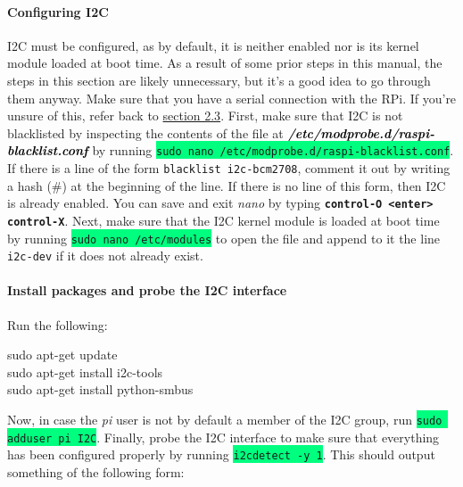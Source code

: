 \documentclass{article}
\newcommand*{\myfont}{\fontfamily{pcr}\selectfont}
\newcommand{\codei}[1]{\colorbox{SpringGreen}{\texttt{#1}}} %
\newcommand{\codeb}[2]{
  \begin{tcolorbox}[width=\textwidth,colback={SpringGreen},title={#1},colbacktitle=darkgreen,coltitle=SpringGreen]
    \myfont
    #2
  \end{tcolorbox}
} %
\newcommand{\outputi}[1]{\colorbox{light-gray}{\texttt{#1}}} %
\newcommand{\red}[1]{\textcolor{BrickRed}{#1}} %
\newcommand{\loc}[1]{\textit{\textcolor{Black}{\textbf{#1}}}} %
\begin{document}
    \paragraph{Configuring I2C}
      \label{sec:configuring-i2c}
      I2C must be configured, as by default, it is neither enabled nor is its kernel module loaded at boot time. As a result of some prior steps in this manual, the steps in this section are likely unnecessary, but it's a good idea to go through them anyway. Make sure that you have a serial connection with the RPi. If you're unsure of this, refer back to \hyperref[sec:connect-serial]{section 2.3}.
      \newline
      \indent
      First, make sure that I2C is not blacklisted by inspecting the contents of the file at \loc{/etc/modprobe.d/raspi-blacklist.conf} by running \codei{sudo nano /etc/modprobe.d/raspi-blacklist.conf}. If there is a line of the form \outputi{blacklist i2c-bcm\red{2708}}, comment it out by writing a hash (\#) at the beginning of the line. If there is no line of this form, then I2C is already enabled. You can save and exit \textit{nano} by typing \texttt{\textbf{control-O <enter> control-X}}.
      \newline
      \indent
      Next, make sure that the I2C kernel module is loaded at boot time by running \codei{sudo nano /etc/modules} to open the file and append to it the line \outputi{i2c-dev} if it does not already exist.
      \newline
      \indent
    \paragraph{Install packages and probe the I2C interface}
    Run the following:
    \codeb{Update environment and install necessary packages}{
      sudo apt-get update \\
      sudo apt-get install i2c-tools \\
      sudo apt-get install python-smbus
    }

    Now, in case the \textit{pi} user is not by default a member of the I2C group, run \codei{sudo adduser pi I2C}.
    \newline
    Finally, probe the I2C interface to make sure that everything has been configured properly by running \codei{i2cdetect -y 1}. This should output something of the following form:
\end{document}
